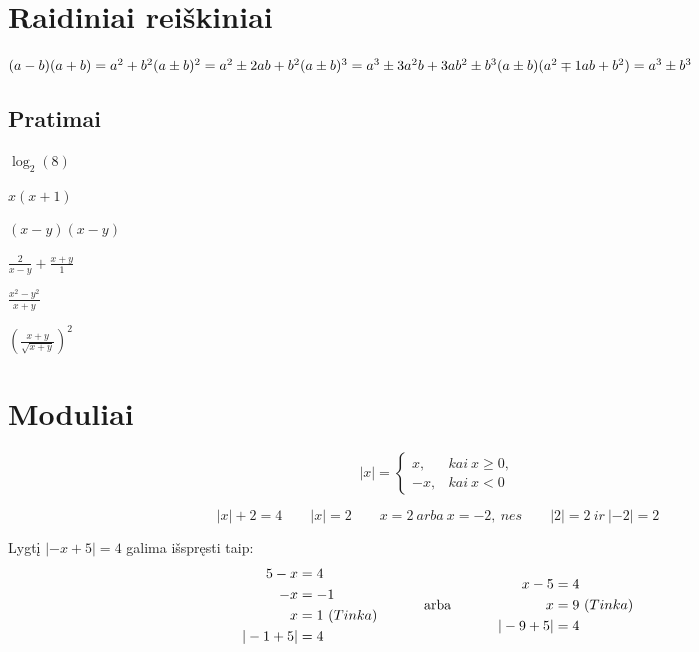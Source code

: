\documentclass[fleqn]{article} %
\newenvironment{exercises}{\begin{enumerate*}[label=\alph*), itemjoin=\qquad]}{\end{enumerate*}}
\DeclareMathOperator{\arba}{\ arba\ }
\begin{document}
\section{Raidiniai reiškiniai}

\begin{math}
    (a - b)(a + b) = a^2 + b^2 \\
    (a \pm b)^2 = a^2 \pm 2ab + b^2 \\
    (a \pm b)^3 = a^3 \pm 3a^2b + 3ab^2 \pm b^3 \\
    (a \pm b)(a^2 \mp 1ab + b^2) = a^3 \pm b^3
\end{math}

\subsection{Pratimai}

\begin{exercises}
    \item $\log_2(8)                         $
    \item $x(x + 1)                          $
    \item $(x - y)(x - y)                    $
    \item $\frac{2}{x - y} + \frac{x + y}{1} $
    \item $\frac{x^2 - y^2}{x + y}           $
    \item $(\frac{x + y}{\sqrt{x + y}})^2$
\end{exercises} 

\section{Moduliai}

\[
|x| =
\begin{cases}
    x,  &kai\ x \ge 0, \\
    -x, &kai\ x < 0
\end{cases}     
\]

\[
|x| + 2 = 4 \qquad
|x| = 2     \qquad
x = 2\ arba\ x = -2,\ nes \qquad
|2| = 2\ ir\ |-2| = 2
\]


Lygtį $|-x + 5| = 4$ galima išspręsti taip:
\begin{equation}
    \begin{aligned}
        5 - x &= 4 \\
        -x &= -1 \\
        x &= 1\ (Tinka) \\
        |-1 + 5| &= 4
    \end{aligned}
    \hspace{10mm}
    \arba
    \hspace{10mm}
    \begin{aligned}
        x - 5 &= 4 \\
        x &= 9\ (Tinka) \\
        |-9 + 5| &= 4
    \end{aligned}    
\end{equation}
\end{document}
